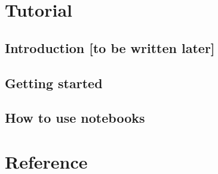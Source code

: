 


\makeindex[intoc]






\hypertarget{contents}{}
\tableofcontents

\mainmatter
{}

\part{Tutorial}

\cleardoublepage
{}

\chapter*{Introduction [to be written later]}
\FILL

\chapter{Getting started}


\chapter{How to use notebooks}
\label{chapter-right-after-getting-started}


\part{Reference}


